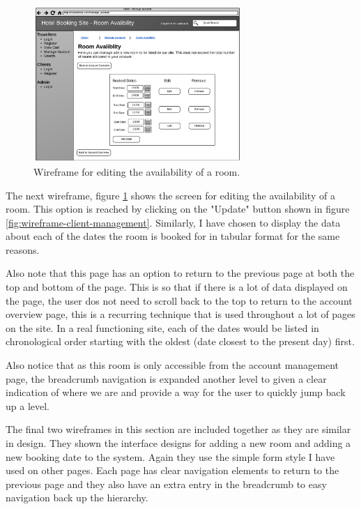 \documentclass{article}
\begin{document}
\begin{figure}[H]
\centering
\includegraphics[width=0.7\textwidth]{img/wireframes/EditAvalibility.png}
\caption{Wireframe for editing the availability of a room.}
\label{fig:wireframe-client-availability}
\end{figure}

The next wireframe, figure \ref{fig:wireframe-client-availability} shows the screen for editing the availability of a room. This option is reached by clicking on the "Update" button shown in figure \ref{fig:wireframe-client-management}. Similarly, I have chosen to display the data about each of the dates the room is booked for in tabular format for the same reasons.

Also note that this page has an option to return to the previous page at both the top and bottom of the page. This is so that if there is a lot of data displayed on the page, the user dos not need to scroll back to the top to return to the account overview page, this is a recurring technique that is used throughout a lot of pages on the site. In a real functioning site, each of the dates would be listed in chronological order starting with the oldest (date closest to the present day) first. 

Also notice that as this room is only accessible from the account management page, the breadcrumb navigation is expanded another level to given a clear indication of where we are and provide a way for the user to quickly jump back up a level.

The final two wireframes in this section are included together as they are similar in design. They shown the interface designs for adding a new room and adding a new booking date to the system. Again they use the simple form style I have used on other pages. Each page has clear navigation elements to return to the previous page and they also have an extra entry in the breadcrumb to easy navigation back up the hierarchy. 
\end{document}
